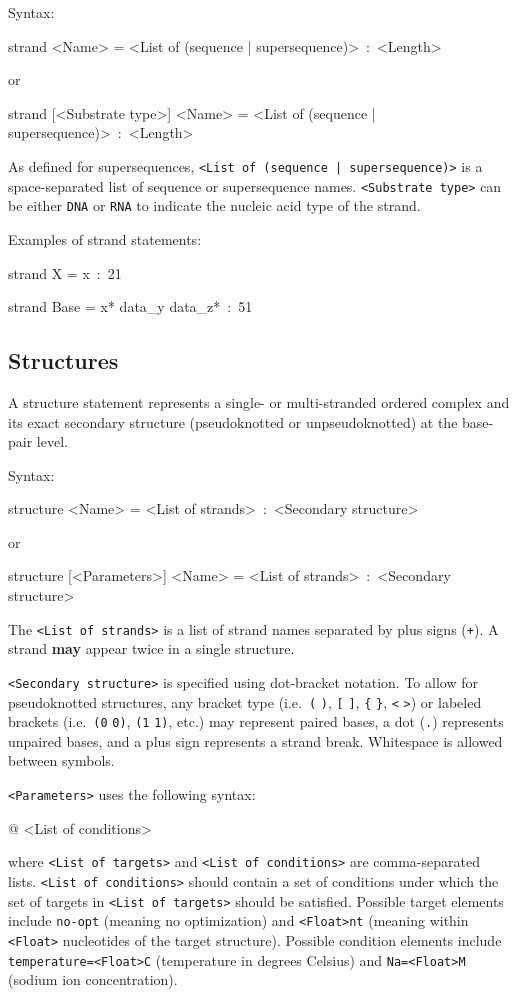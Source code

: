 \documentclass{article}
\newenvironment{code}
{\vspace{-0.1in}\par\begin{list}{}{
\setlength{\listparindent}{0pt}
\raggedright
\setlength{\itemsep}{0pt}
\setlength{\parsep}{0pt}
\normalfont\ttfamily}
 \item[]}
{\end{list}\vspace{-0.1in}}
\begin{document}
Syntax:
\begin{code}
strand <Name> = <List of (sequence | supersequence)>~:~<Length>
\end{code}
or
\begin{code}
strand [<Substrate type>] <Name> = <List of (sequence | supersequence)>~:~<Length>
\end{code}

As defined for supersequences, \texttt{<List of (sequence | supersequence)>} is a space-separated list of sequence or supersequence names. \texttt{<Substrate type>} can be either \texttt{DNA} or \texttt{RNA} to indicate the nucleic acid type of the strand.

Examples of strand statements:
\begin{code}
strand X = x~:~21

strand Base = x{*} data\_y data\_z{*}~:~51
\end{code}

\subsection{Structures}

A structure statement represents a single- or multi-stranded ordered complex and its exact secondary structure (pseudoknotted or unpseudoknotted) at the base-pair level.

Syntax:
\begin{code}
structure <Name> = <List of strands>~:~<Secondary structure>
\end{code}
or
\begin{code}
structure [<Parameters>] <Name> = <List of strands>~:~<Secondary structure>
\end{code}
The \texttt{<List of strands>} is a list of strand names separated by plus signs (\texttt{+}). A strand \textbf{may} appear twice in a single structure.

\texttt{<Secondary structure>} is specified using dot-bracket
notation. To allow for pseudoknotted structures, any bracket type (i.e.\ \texttt{(} \texttt{)}, \texttt{[} \texttt{]}, \texttt{\{} \texttt{\}}, \texttt{<} \texttt{>}) or labeled brackets (i.e.\ \texttt{(0} \texttt{0)}, \texttt{(1} \texttt{1)}, etc.) may represent paired bases, a dot (\texttt{.}) represents unpaired bases, and a plus sign represents a strand break. Whitespace is allowed between symbols. 

\texttt{<Parameters>} uses the following syntax:
\begin{code}
<List of targets> \textsf{@} <List of conditions>
\end{code}
where \texttt{<List of targets>} and \texttt{<List of conditions>} are comma-separated lists. \texttt{<List of conditions>} should contain a set of conditions under which the set of targets in \texttt{<List of targets>} should be satisfied. Possible target elements include \texttt{no-opt} (meaning no optimization) and \texttt{<Float>nt} (meaning within \texttt{<Float>} nucleotides of the target structure). Possible condition elements include \texttt{temperature=<Float>C} (temperature in degrees Celsius) and \texttt{Na=<Float>M} (sodium ion concentration).
\end{document}
